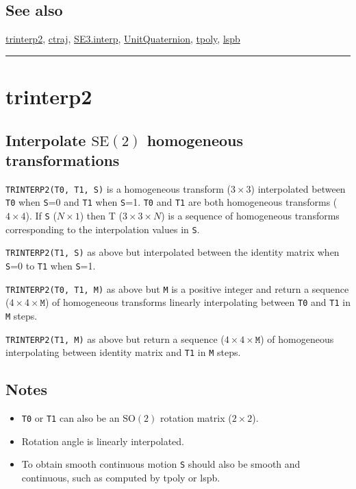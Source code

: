 \subsection*{See also}


\hyperlink{trinterp2}{\color{blue} trinterp2}, \hyperlink{ctraj}{\color{blue} ctraj}, \hyperlink{SE3.interp}{\color{blue} SE3.interp}, \hyperlink{UnitQuaternion}{\color{blue} UnitQuaternion}, \hyperlink{tpoly}{\color{blue} tpoly}, \hyperlink{lspb}{\color{blue} lspb}

\vspace{1.5ex}\rule{\textwidth}{1mm}

\hypertarget{trinterp2}{\section*{trinterp2}}
\subsection*{Interpolate $\mbox{SE}(2)$ homogeneous transformations}


\texttt{TRINTERP2(T0, T1, S)} is a homogeneous transform ($3 \times 3$) interpolated
between \texttt{T0} when \texttt{S}=0 and \texttt{T1} when \texttt{S}=1.  \texttt{T0} and \texttt{T1} are both homogeneous
transforms ($4 \times 4$).  If \texttt{S} ($N \times 1$) then T ($3 \times 3 \times N$) is a sequence of
homogeneous transforms corresponding to the interpolation values in \texttt{S}.



\texttt{TRINTERP2(T1, S)} as above but interpolated between the identity matrix
when \texttt{S}=0 to \texttt{T1} when \texttt{S}=1.



\texttt{TRINTERP2(T0, T1, M)} as above but \texttt{M} is a positive integer and return a
sequence ($4 \times 4 \times \texttt{M}$) of homogeneous transforms linearly interpolating between
\texttt{T0} and \texttt{T1} in \texttt{M} steps.



\texttt{TRINTERP2(T1, M)} as above but return a sequence ($4 \times 4 \times \texttt{M}$) of
homogeneous interpolating between identity matrix and \texttt{T1} in \texttt{M} steps.


\subsection*{Notes}
\begin{itemize}
  \item \texttt{T0} or \texttt{T1} can also be an $\mbox{SO}(2)$ rotation matrix ($2 \times 2$).
  \item Rotation angle is linearly interpolated.
  \item To obtain smooth continuous motion \texttt{S} should also be smooth and continuous,    such as computed by tpoly or lspb.
\end{itemize}

